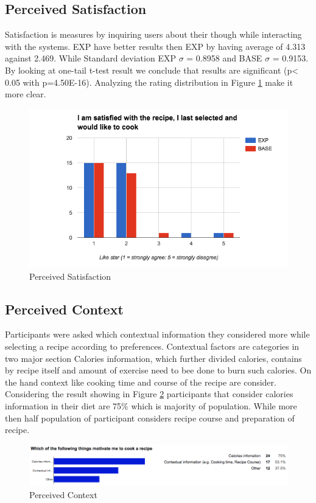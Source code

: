 \subsection{Perceived Satisfaction}
Satisfaction is measures by inquiring users about their though while interacting with the systems. EXP have better results then EXP by having average of 4.313 against 2.469. While  Standard deviation EXP ${\sigma}$ = 0.8958 and BASE ${\sigma}$ = 0.9153. By looking at one-tail t-test result we conclude that results are significant (p< 0.05 with p=4.50E-16). Analyzing the rating distribution in Figure \ref{fig:ch5_stat_satisfaction} make it more clear. 
\begin{figure}[h]
	\centering
	\includegraphics[width= 1\linewidth]{figures/ch5_stat_satisfaction}
	\caption{Perceived Satisfaction}
	\label{fig:ch5_stat_satisfaction}
\end{figure}
\newpage
\subsection{Perceived Context}
Participants were asked which contextual information they considered more while selecting a recipe according to preferences. Contextual factors are categories in two major section Calories information, which further divided calories, contains by recipe itself and amount of exercise need to bee done to burn such calories. On the hand context like cooking time and course of the recipe are consider. Considering the result showing in Figure \ref{fig:ch5_stat_context} participants that consider calories information in their diet are 75\% which is majority of population. While more then half population of participant considers recipe course and preparation of recipe. 
\begin{figure}[h]
	\centering
	\includegraphics[width= 1\linewidth]{figures/ch5_stat_context}
	\caption{Perceived Context}
	\label{fig:ch5_stat_context}
\end{figure}
